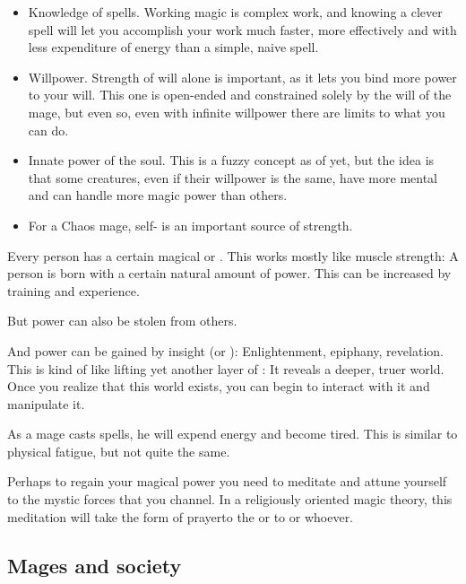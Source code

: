 \begin{itemize}
  \item Knowledge of spells. 
    Working magic is complex work, and knowing a clever spell will let you accomplish your work much faster, more effectively and with less expenditure of energy than a simple, naive spell. 
  \item Willpower. 
    Strength of will alone is important, as it lets you bind more power to your will. This one is open-ended and constrained solely by the will of the mage, but even so, even with infinite willpower there are limits to what you can do.
  \item Innate power of the soul. 
    This is a fuzzy concept as of yet, but the idea is that some creatures, even if their willpower is the same, have more mental  and can handle more magic power than others. 
  \item   
    For a Chaos mage, self- is an important source of strength. 
\end{itemize}

Every person has a certain magical  or . 
This works mostly like muscle strength: 
A person is born with a certain natural amount of power. 
This can be increased by training and experience. 

But power can also be stolen from others. 

And power can be gained by insight (or ): 
Enlightenment, epiphany, revelation. 
This is kind of like lifting yet another layer of : 
It reveals a deeper, truer world. 
Once you realize that this world exists, you can begin to interact with it and manipulate it. 

As a mage casts spells, he will expend energy and become tired. This is similar to physical fatigue, but not quite the same. 

Perhaps to regain your magical power you need to meditate and attune yourself to the mystic forces that you channel. In a religiously oriented magic theory, this meditation will take the form of prayer\dash{}to the \Sephiroth{} or to  or whoever. 









\subsection{Mages and society}





